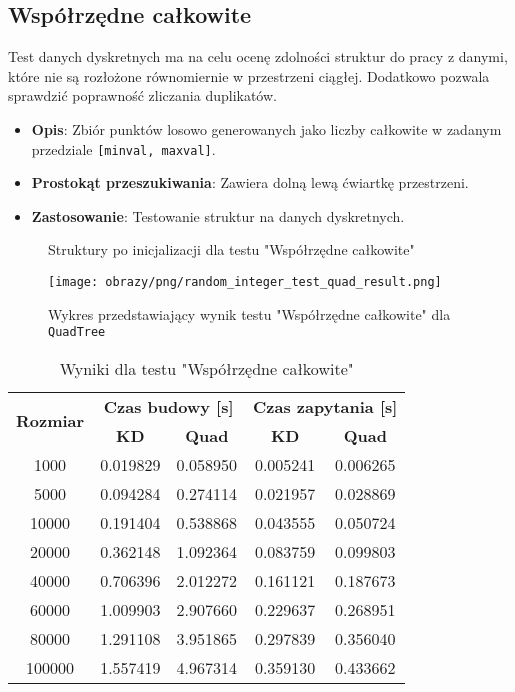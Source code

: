 \documentclass[12pt]{article}
\begin{document}
\subsection{Współrzędne całkowite}
Test danych dyskretnych ma na celu ocenę zdolności struktur do pracy z danymi, które nie są rozłożone równomiernie w przestrzeni ciągłej. Dodatkowo pozwala sprawdzić poprawność zliczania duplikatów.
\begin{itemize}
    \item \textbf{Opis}: Zbiór punktów losowo generowanych jako liczby całkowite w zadanym przedziale \texttt{[minval, maxval]}.
    \item \textbf{Prostokąt przeszukiwania}: Zawiera dolną lewą ćwiartkę przestrzeni.
    \item \textbf{Zastosowanie}: Testowanie struktur na danych dyskretnych.
\end{itemize}

\begin{figure}[h]
    \centering
    \qquad
    \caption{Struktury po inicjalizacji dla testu "Współrzędne całkowite"}%
    \label{fig:random_integer}%
\end{figure}

\begin{figure}[h]
    \centering
    \texttt{[image: obrazy/png/random\_integer\_test\_quad\_result.png]}
    \caption{Wykres przedstawiający wynik testu "Współrzędne całkowite" dla \texttt{QuadTree}}
    \label{fig:random_integer_test_quad_result}
\end{figure}

\begin{table}[h]
\centering
\caption{Wyniki dla testu "Współrzędne całkowite"}
\label{tab:random_integer_test}
\begin{tabular}{ccccc}
\toprule
\multirow{2}{*}{\textbf{Rozmiar}} & \multicolumn{2}{c}{\textbf{Czas budowy [s]}} & \multicolumn{2}{c}{\textbf{Czas zapytania [s]}} \\
\cmidrule(lr){2-3} \cmidrule(lr){4-5}
 & \textbf{KD} & \textbf{Quad} & \textbf{KD} & \textbf{Quad} \\
\midrule
1000   & 0.019829 & 0.058950 & 0.005241 & 0.006265 \\
5000   & 0.094284 & 0.274114 & 0.021957 & 0.028869 \\
10000  & 0.191404 & 0.538868 & 0.043555 & 0.050724 \\
20000  & 0.362148 & 1.092364 & 0.083759 & 0.099803 \\
40000  & 0.706396 & 2.012272 & 0.161121 & 0.187673 \\
60000  & 1.009903 & 2.907660 & 0.229637 & 0.268951 \\
80000  & 1.291108 & 3.951865 & 0.297839 & 0.356040 \\
100000 & 1.557419 & 4.967314 & 0.359130 & 0.433662 \\
\bottomrule
\end{tabular}
\end{table}
\end{document}
